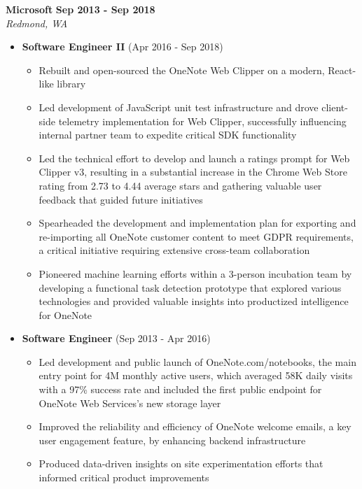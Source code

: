 \documentclass[10pt,letterpaper]{article}
\newcommand{\experienceentry}[5]{
  \noindent\textbf{#1} \hfill \textbf{#2}\\
  \textit{#3} \hfill \textit{#4}\\[-8pt]
  #5
}
\begin{document}
\experienceentry{Microsoft}{Sep 2013 - Sep 2018}{Redmond, WA}{}{
\begin{itemize}[leftmargin=*, nosep]
  \item \textbf{Software Engineer II} (Apr 2016 - Sep 2018)
  \begin{itemize}[leftmargin=*, nosep]
    \item Rebuilt and open-sourced the OneNote Web Clipper on a modern, React-like library
    \item Led development of JavaScript unit test infrastructure and drove client-side telemetry implementation for Web Clipper, successfully influencing internal partner team to expedite critical SDK functionality
    \item Led the technical effort to develop and launch a ratings prompt for Web Clipper v3, resulting in a substantial increase in the Chrome Web Store rating from 2.73 to 4.44 average stars and gathering valuable user feedback that guided future initiatives
    \item Spearheaded the development and implementation plan for exporting and re-importing all OneNote customer content to meet GDPR requirements, a critical initiative requiring extensive cross-team collaboration
    \item Pioneered machine learning efforts within a 3-person incubation team by developing a functional task detection prototype that explored various technologies and provided valuable insights into productized intelligence for OneNote
  \end{itemize}
  \item \textbf{Software Engineer} (Sep 2013 - Apr 2016)
  \begin{itemize}[leftmargin=*, nosep]
    \item Led development and public launch of OneNote.com/notebooks, the main entry point for 4M monthly active users, which averaged 58K daily visits with a 97\% success rate and included the first public endpoint for OneNote Web Services's new storage layer
    \item Improved the reliability and efficiency of OneNote welcome emails, a key user engagement feature, by enhancing backend infrastructure
    \item Produced data-driven insights on site experimentation efforts that informed critical product improvements
  \end{itemize}
\end{itemize}
}

\end{document}
